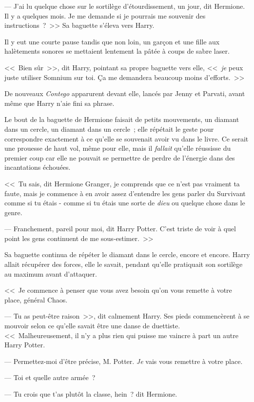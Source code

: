 --- J'ai lu quelque chose sur le sortilège d'étourdissement, un jour, dit Hermione. Il y a quelques mois. Je me demande si je pourrais me souvenir des instructions~?~>> Sa baguette s'éleva vers Harry.

Il y eut une courte pause tandis que non loin, un garçon et une fille aux halètements sonores se mettaient lentement la pâtée à coups de sabre laser.

<<~Bien sûr~>>, dit Harry, pointant sa propre baguette vers elle, <<~\emph{je} peux juste utiliser Somnium sur toi. Ça me demandera beaucoup moins d'efforts.~>>

De nouveaux \emph{Contego} apparurent devant elle, lancés par Jenny et Parvati, avant même que Harry n'aie fini sa phrase.

Le bout de la baguette de Hermione faisait de petits mouvements, un diamant dans un cercle, un diamant dans un cercle~; elle répétait le geste pour correspondre exactement à ce qu'elle se souvenait avoir vu dans le livre. Ce serait une prouesse de haut vol, même pour elle, mais il \emph{fallait} qu'elle réussisse du premier coup car elle ne pouvait se permettre de perdre de l'énergie dans des incantations échouées.

<<~Tu sais, dit Hermione Granger, je comprends que ce n'est pas vraiment ta faute, mais je commence à en avoir assez d'entendre les gens parler du Survivant comme si tu étais - comme si tu étais une sorte de \emph{dieu} ou quelque chose dans le genre.

--- Franchement, pareil pour moi, dit Harry Potter. C'est triste de voir à quel point les gens continuent de me sous-estimer.~>>

Sa baguette continua de répéter le diamant dans le cercle, encore et encore. Harry allait récupérer des forces, elle le savait, pendant qu'elle pratiquait son sortilège au maximum avant d'attaquer.

<<~Je commence à penser que vous avez besoin qu'on vous remette à votre place, général Chaos.

--- Tu as peut-être raison~>>, dit calmement Harry. Ses pieds commencèrent à se mouvoir selon ce qu'elle savait être une danse de duettiste. <<~Malheureusement, il n'y a plus rien qui puisse me vaincre à part un autre Harry Potter.

--- Permettez-moi d'être précise, M. Potter. \emph{Je} vais vous remettre à votre place.

--- Toi et quelle autre armée~?

--- Tu crois que t'as plutôt la classe, hein~? dit Hermione.

